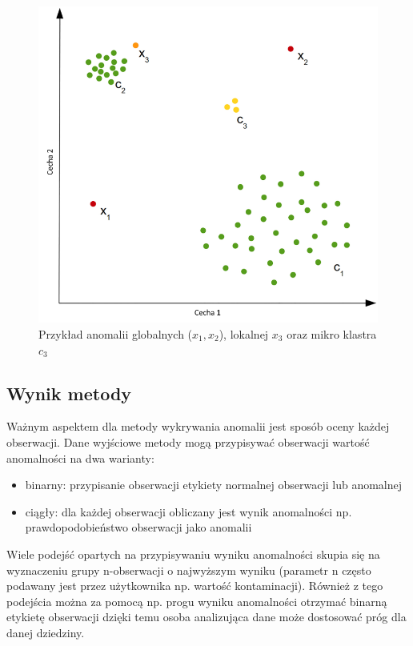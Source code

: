 \begin{figure}
    \centering
    \includegraphics[width=.5\textwidth]{chapters/istniejace/images/mikro_cluste.png}
    \caption{Przykład anomalii globalnych ($x_1, x_2$), lokalnej $x_3$ oraz mikro klastra $c_3$ \cite{goldstein2016comparative}}
    \label{fig:anomalie_glob_lok}
\end{figure}

\subsection{Wynik metody}
\label{sec:score}
Ważnym aspektem dla metody wykrywania anomalii jest sposób oceny każdej obserwacji. Dane wyjściowe metody mogą przypisywać obserwacji wartość anomalności na dwa warianty:
\begin{itemize}
    \item binarny: przypisanie obserwacji etykiety normalnej obserwacji lub anomalnej
    \item ciągły: dla każdej obserwacji obliczany jest wynik anomalności np. prawdopodobieństwo obserwacji jako anomalii
\end{itemize}
Wiele podejść opartych na przypisywaniu wyniku anomalności skupia się na wyznaczeniu grupy n-obserwacji o najwyższym wyniku (parametr n często podawany jest przez użytkownika np. wartość kontaminacji). Również z tego podejścia można za pomocą np. progu wyniku anomalności otrzymać binarną etykietę obserwacji dzięki temu osoba analizująca dane może dostosować próg dla danej dziedziny.

